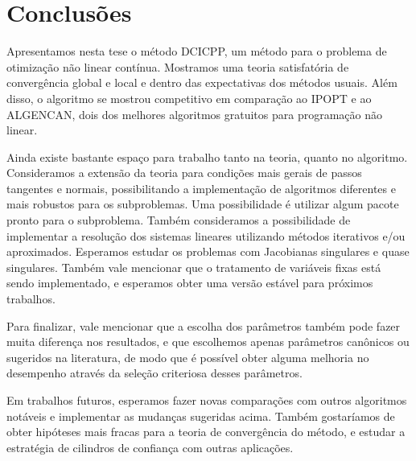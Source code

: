 \chapter{Conclusões}

Apresentamos nesta tese o método DCICPP, um método para o problema
de otimização não linear contínua. 
Mostramos uma teoria satisfatória de convergência global e local e dentro das
expectativas dos métodos usuais. Além disso, o algoritmo se mostrou competitivo
em comparação ao IPOPT e ao ALGENCAN, dois dos melhores algoritmos gratuitos
para programação não linear.

Ainda existe bastante espaço para trabalho tanto na teoria, quanto no algoritmo.
Consideramos a extensão da teoria para condições mais gerais de passos tangentes
e normais, possibilitando a implementação de algoritmos diferentes e mais
robustos para os subproblemas. Uma possibilidade é utilizar algum pacote pronto
para o subproblema.
Também consideramos a possibilidade de implementar a resolução dos sistemas
lineares utilizando métodos iterativos e/ou aproximados. Esperamos estudar os
problemas com Jacobianas singulares e quase singulares.
Também vale mencionar que o tratamento de variáveis fixas está sendo
implementado, e esperamos obter uma versão estável para próximos trabalhos.

Para finalizar, vale mencionar que a escolha dos parâmetros também pode fazer
muita diferença nos resultados, e que escolhemos apenas parâmetros canônicos ou
sugeridos na literatura, de modo que é possível obter alguma melhoria no
desempenho através da seleção criteriosa desses parâmetros.

Em trabalhos futuros, esperamos fazer novas comparações com outros algoritmos
notáveis e implementar as mudanças sugeridas acima. 
Também gostaríamos de obter hipóteses mais fracas para a teoria de convergência
do método, e estudar a estratégia de cilindros de confiança com outras
aplicações.
